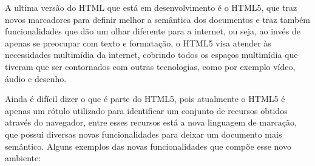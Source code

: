 A ultima versão do HTML que está em desenvolvimento é o HTML5, que
traz novos marcadores para definir melhor a semântica dos documentos e
traz também funcionalidades que dão um olhar diferente para a internet,
ou seja, ao invés de apenas se preocupar com texto e formatação, o HTML5
visa atender às necessidades multimídia da internet, cobrindo todos os
espaços multimídia que tiveram que ser contornados com outras tecnologias,
como por exemplo vídeo, áudio e desenho.

Ainda é difícil dizer o que é parte do HTML5, pois atualmente o HTML5
é apenas um rótulo utilizado para identificar um conjunto de recursos
obtidos através do navegador, entre esses recursos está a nova
linguagem de marcação, que possui diversas novas funcionalidades para
deixar um documento mais semântico.
Alguns exemplos das novas funcionalidades que compõe esse novo ambiente:

